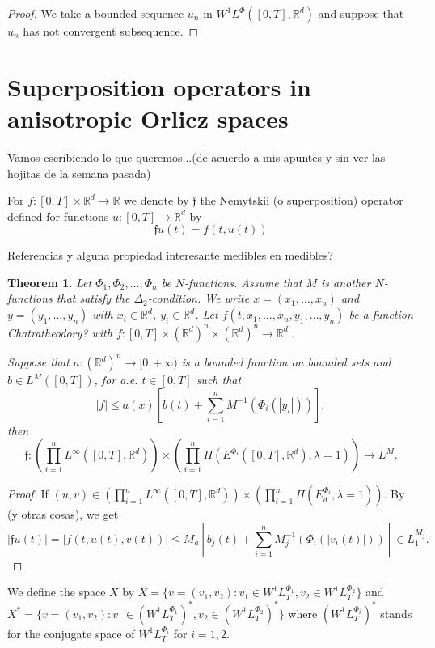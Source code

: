 \documentclass[twoside]{article}
\newtheorem{thm}{Theorem}[section]
\theoremstyle{remark}
\newcommand{\lphi}{L^{\Phi}}
\newcommand{\lmj}{L^{M}}
\newcommand{\wphi}{W^{1}\lphi}
\newcommand{\rr}{\mathbb{R}}
\renewcommand{\leq}{\leqslant}
\begin{document}
\begin{proof}
We take a bounded sequence
$u_n$ in $\wphi([0,T],\rr^d)$ and suppose that $u_n$ has not convergent subsequence.


\end{proof}




\section{Superposition operators in anisotropic Orlicz spaces}

Vamos escribiendo lo que queremos...(de acuerdo a mis apuntes y sin ver las hojitas de la semana pasada)

For $f:[0,T]\times \rr^d\to\rr$  we denote by $\mathfrak{f}$ the Nemytskii (o superposition) operator defined for functions $u:[0,T]\to\rr^d$ by 
\[\mathfrak{f}u(t)=f(t,u(t))\]

Referencias y alguna propiedad interesante medibles en medibles? \cite{krasnosel2011integral,KR}


\begin{thm}
Let $\Phi_1,\Phi_2,\dots,\Phi_n$ be $N$-functions. 
Assume that $M$ is another $N$-functions that satisfy the $\Delta_2$-condition. 
We write $x=(x_1,\dots,x_n)$  and $y=(y_1,\dots,y_n)$ with $x_i\in \rr^d$, $y_i\in \rr^d$.
Let $f(t,x_1,\ldots,x_n,y_1,\ldots,y_n)$ be a function Chatratheodory? with $f:[0,T]\times {(\rr^d)}^n\times {(\rr^d)}^n \to \rr^{d'}$.

Suppose that $a:(\rr^d)^n\to [0,+\infty)$ is a bounded function on bounded sets and 
$b \in L^{M}([0,T])$, for a.e. $t \in [0, T]$ such that 
\begin{equation}\label{eq:condicion estru gral}
|f|\leq a(x)[ b(t)+\sum_{i=1}^{n} M^{-1}(\Phi_i(|y_i|))],
\end{equation}
then 
\[
\mathfrak{f}:\left(\prod\limits_{i=1}^n L^{\infty}([0,T],\rr^d)\right) \times \left(\prod\limits_{i=1}^n \Pi(E^{\Phi_i}([0,T],\rr^d),\lambda=1)\right)
\to \lmj.\]
\end{thm}

\begin{proof}
If $(u,v)\in \left(\prod\limits_{i=1}^n L^{\infty}([0,T],\rr^d)\right) \times \left(\prod\limits_{i=1}^n \Pi(E_d^{\Phi_i},\lambda=1)\right)$.
By \cite[ Thm. 17.6]{KR} (y otras cosas), we get 
 \[|\mathfrak{f}u(t)|=|f(t,u(t),v(t))| \leq 
M_a [b_j(t) +\sum_{i=1}^{n} M_j^{-1}(\Phi_i(|v_i(t)|))]
\in
 L_1^{M_j}.\]
\end{proof}

We define the space $X$ by
$X=\{v=(v_1,v_2):v_1 \in W^{1}L^{\Phi_1}_T,v_2\in W^{1}L^{\Phi_2}_T\}$
and 
$X^*=\{v=(v_1,v_2):v_1 \in (W^{1}L^{\Phi_1}_T)^*,v_2\in (W^{1}L^{\Phi_2}_T)^*\}$
where $(W^{1}L^{\Phi_i}_T)^*$ stands for the conjugate space of $W^{1}L^{\Phi_i}_T$ for $i=1,2$.
\end{document}
